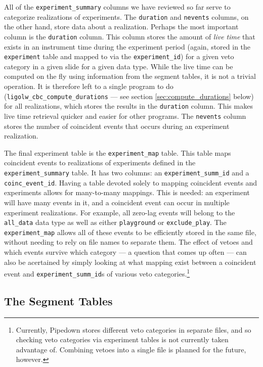 All of the \texttt{experiment\_summary} columns we have reviewed so far serve to categorize realizations of experiments. The \texttt{duration} and \texttt{nevents} columns, on the other hand, store data about a realization. Perhaps the most important column is the \texttt{duration} column. This column stores the amount of \emph{live time} that exists in an instrument time during the experiment period (again, stored in the \texttt{experiment} table and mapped to via the \texttt{experiment\_id}) for a given veto category in a given slide for a given data type. While the live time can be computed on the fly using information from the segment tables, it is not a trivial operation. It is therefore left to a single program to do (\texttt{ligolw\_cbc\_compute\_durations} --- see section \ref{sec:compute_durations} below) for all realizations, which stores the results in the \texttt{duration} column. This makes live time retrieval quicker and easier for other programs. The \texttt{nevents} column stores the number of coincident events that occurs during an experiment realization.

The final experiment table is the \texttt{experiment\_map} table. This table maps coincident events to realizations of experiments defined in the \texttt{experiment\_summary} table. It has two columns: an \texttt{experiment\_summ\_id} and a \texttt{coinc\_event\_id}. Having a table devoted solely to mapping coincident events and experiments allows for many-to-many mappings. This is needed: an experiment will have many events in it, and a coincident event can occur in multiple experiment realizations. For example, all zero-lag events will belong to the \texttt{all\_data} data type as well as either \texttt{playground} or \texttt{exclude\_play}. The \texttt{experiment\_map} allows all of these events to be efficiently stored in the same file, without needing to rely on file names to separate them. The effect of vetoes and which events survive which category --- a question that comes up often --- can also be acertained by simply looking at what mapping exist between a coincident event and \texttt{experiment\_summ\_id}s of various veto categories.\footnote{Currently, Pipedown stores different veto categories in separate files, and so checking veto categories via experiment tables is not currently taken advantage of. Combining vetoes into a single file is planned for the future, however.}

\subsection{The Segment Tables}

